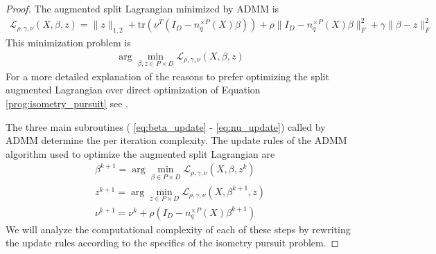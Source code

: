 \begin{proof}
The augmented split Lagrangian minimized by ADMM is
    \begin{align}
    \mathcal L_{\rho,\gamma, \nu} (X,\beta,z) = \|z\|_{1,2} + \text{tr}(\nu^T (I_D - n_q^{\times P}(X) \beta)) + \rho \|I_D - n_q^{\times P}(X) \beta\|_F^2 + \gamma \|\beta - z\|_F^2
    \end{align}
This minimization problem is
    \begin{align}
        \arg \min_{\beta,z \in P \times D} \mathcal L_{\rho,\gamma,\nu} (X,\beta,z)
    \end{align}
For a more detailed explanation of the reasons to prefer optimizing the split augmented Lagrangian over direct optimization of Equation \ref{prog:isometry_pursuit} see \citet{Boyd2010-jd}.
    
The three main subroutines ( \ref{eq:beta_update} - \ref{eq:nu_update}) called by ADMM determine the per iteration complexity.
The update rules of the ADMM algorithm used to optimize the augmented split Lagrangian are
    \begin{align}
    \beta^{k+1} = \arg \min_{\beta \in P \times D} \mathcal L_{\rho,\gamma,\nu} (X,\beta,z^k) \\
    z^{k+1} = \arg \min_{z \in P \times D} \mathcal L_{\rho,\gamma,\nu} (X,\beta^{k+1},z) \\
    \nu^{k+1} = \nu^k + \rho (I_D - n_q^{\times P}(X) \beta^{k+1})
    \end{align}
We will analyze the computational complexity of each of these steps by rewriting the update rules according to the specifics of the isometry pursuit problem.


\end{proof}
